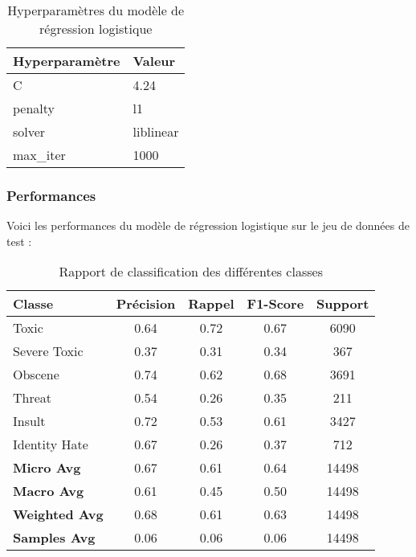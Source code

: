 \begin{table}[h]
\centering
\begin{tabular}{|l|l|}
\hline
\textbf{Hyperparamètre} & \textbf{Valeur} \\ \hline
C                       & 4.24             \\ \hline
penalty                 & l1            \\ \hline
solver                  & liblinear           \\ \hline
max\_iter               & 1000           \\ \hline
\end{tabular}
\caption{Hyperparamètres du modèle de régression logistique}
\end{table}

\subsubsection*{Performances}

Voici les performances du modèle de régression logistique sur le jeu de données de test :

\begin{table}[h]
    \centering
    \begin{tabular}{lcccc}
        \hline
        \textbf{Classe} & \textbf{Précision} & \textbf{Rappel} & \textbf{F1-Score} & \textbf{Support} \\
        \hline
        Toxic          & 0.64 & 0.72 & 0.67 & 6090 \\
        Severe Toxic   & 0.37 & 0.31 & 0.34 & 367 \\
        Obscene        & 0.74 & 0.62 & 0.68 & 3691 \\
        Threat         & 0.54 & 0.26 & 0.35 & 211 \\
        Insult         & 0.72 & 0.53 & 0.61 & 3427 \\
        Identity Hate  & 0.67 & 0.26 & 0.37 & 712 \\
        \hline
        \textbf{Micro Avg} & 0.67 & 0.61 & 0.64 & 14498 \\
        \textbf{Macro Avg} & 0.61 & 0.45 & 0.50 & 14498 \\
        \textbf{Weighted Avg} & 0.68 & 0.61 & 0.63 & 14498 \\
        \textbf{Samples Avg} & 0.06 & 0.06 & 0.06 & 14498 \\
        \hline
    \end{tabular}
    \caption{Rapport de classification des différentes classes}
    \label{tab:classification_report}
\end{table}
